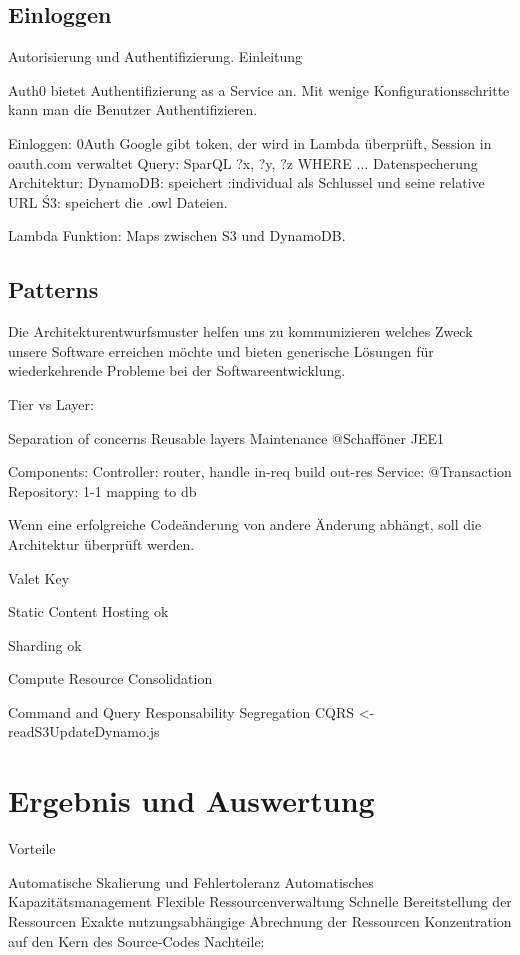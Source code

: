 \documentclass[
12pt,
english,
ngerman,
headsepline,
twoside,
openright,
numbers=noenddot,version=first
]{scrreprt}
\begin{document}
\section{Einloggen}

Autorisierung und Authentifizierung. Einleitung

Auth0 bietet Authentifizierung as a Service an. Mit wenige Konfigurationsschritte kann man die Benutzer Authentifizieren. 


Einloggen: 0Auth Google gibt token, der wird in Lambda überprüft, Session in oauth.com verwaltet
Query: SparQL ?x, ?y, ?z WHERE ...
Datenspecherung Architektur:
DynamoDB: speichert :individual als Schlussel und seine relative URL
Ś3: speichert die .owl Dateien.

Lambda Funktion: Maps zwischen S3 und DynamoDB.

\section{Patterns}

Die Architekturentwurfsmuster helfen uns zu kommunizieren welches Zweck unsere Software erreichen möchte und bieten generische Lösungen für wiederkehrende Probleme bei der Softwareentwicklung.

Tier vs Layer: \cite{sbarski2017serverless}

Separation of concerns
Reusable layers
Maintenance @Schafföner JEE1

Components: 
Controller: router, handle in-req build out-res
Service: @Transaction
Repository: 1-1 mapping to db

Wenn eine erfolgreiche Codeänderung von andere Änderung abhängt, soll die Architektur überprüft werden. 

Valet Key \cite{homer2014cloud}

Static Content Hosting ok

Sharding ok

Compute Resource Consolidation 

Command and Query Responsability Segregation CQRS <- readS3UpdateDynamo.js

\chapter{Ergebnis und Auswertung}
Vorteile

Automatische Skalierung und Fehlertoleranz
Automatisches Kapazitätsmanagement
Flexible Ressourcenverwaltung
Schnelle Bereitstellung der Ressourcen
Exakte nutzungsabhängige Abrechnung der Ressourcen
Konzentration auf den Kern des Source-Codes
Nachteile:
\end{document}
